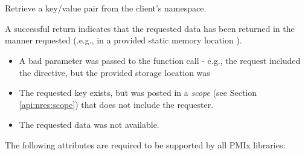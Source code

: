 \section{}

\summary

Retrieve a key/value pair from the client's namespace.

\format


\begin{arglist}
\end{arglist}

A successful return indicates that the requested data has been returned in the manner requested (.e.g., in a provided static memory location ).

\returnstart
\begin{itemize}
\item {} A bad parameter was passed to the function call - e.g., the request included the  directive, but the provided storage location was 
\item {} The requested key exists, but was posted in a \emph{scope} (see Section \ref{api:nres:scope}) that does not include the requester.
\item {} The requested data was not available.
\end{itemize}
\returnend

\reqattrstart
The following attributes are required to be supported by all \ac{PMIx} libraries:


